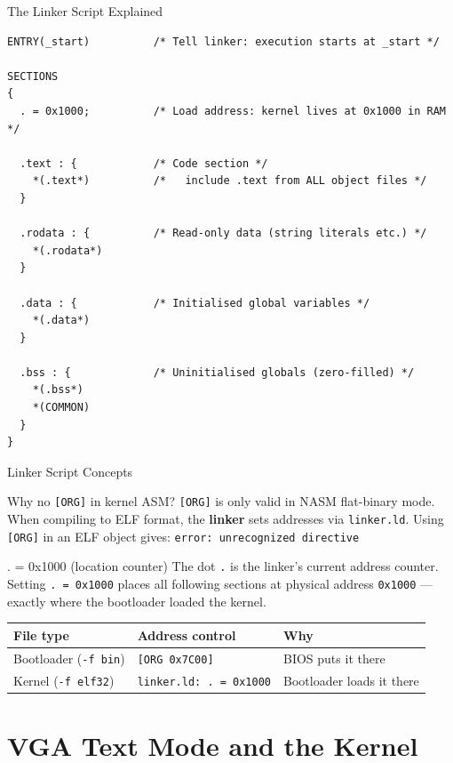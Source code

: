 \documentclass[aspectratio=169]{beamer}
\newcommand{\concept}[2]{%
  \begin{block}{#1}\smallskip #2\smallskip\end{block}\vspace{5pt}}
\begin{document}
\begin{frame}[fragile]{The Linker Script Explained}
  \begin{lstlisting}[style=linker]
ENTRY(_start)          /* Tell linker: execution starts at _start */

SECTIONS
{
  . = 0x1000;          /* Load address: kernel lives at 0x1000 in RAM */

  .text : {            /* Code section */
    *(.text*)          /*   include .text from ALL object files */
  }

  .rodata : {          /* Read-only data (string literals etc.) */
    *(.rodata*)
  }

  .data : {            /* Initialised global variables */
    *(.data*)
  }

  .bss : {             /* Uninitialised globals (zero-filled) */
    *(.bss*)
    *(COMMON)
  }
}
  \end{lstlisting}
\end{frame}

\begin{frame}{Linker Script Concepts}
  \concept{Why no \texttt{[ORG]} in kernel ASM?}{
    \texttt{[ORG]} is only valid in NASM flat-binary mode. When compiling to ELF format, the \textbf{linker} sets addresses via \texttt{linker.ld}. Using \texttt{[ORG]} in an ELF object gives:
    \texttt{error: unrecognized directive}
  }
  \concept{. = 0x1000 (location counter)}{
    The dot \texttt{.} is the linker's current address counter. Setting \texttt{. = 0x1000} places all following sections at physical address \texttt{0x1000} --- exactly where the bootloader loaded the kernel.
  }
  \begin{tabular}{lll}
    \toprule
    \textbf{File type} & \textbf{Address control} & \textbf{Why}\\
    \midrule
    Bootloader (\texttt{-f bin}) & \texttt{[ORG 0x7C00]} & BIOS puts it there\\
    Kernel (\texttt{-f elf32}) & \texttt{linker.ld: . = 0x1000} & Bootloader loads it there\\
    \bottomrule
  \end{tabular}
\end{frame}

\section{VGA Text Mode and the Kernel}
\end{document}
